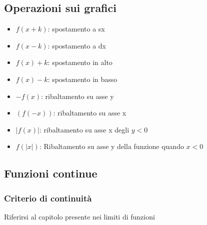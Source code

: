\documentclass{report}
\begin{document}
    \subsection{Operazioni sui grafici}
        \begin{itemize}
            \item $f(x+k)$: spostamento a sx
            \item $f(x-k)$: spostamento a dx
            \item $f(x) + k$: spostamento in alto
            \item $f(x) - k$: spostamento in basso
            \item $-f(x)$: ribaltamento su asse y
            \item $(f(-x))$: ribaltamento su asse x
            \item $|f(x)|$: ribaltamento su asse x degli $y < 0$
            \item $f(|x|)$: Ribaltamento su asse y della funzione quando $x < 0$
        \end{itemize}
    \subsection{Funzioni continue}
        \subsubsection{Criterio di continuità}
            Riferirsi al capitolo presente nei limiti di funzioni
\end{document}

